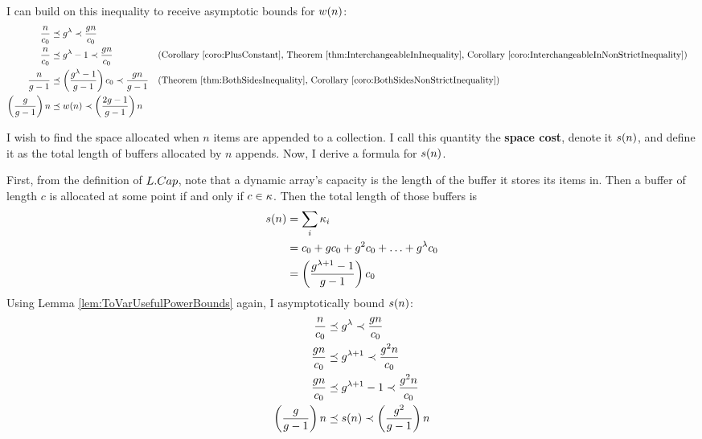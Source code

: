 I can build on this inequality to receive asymptotic bounds for $w(n)$:
\begin{align*}
\frac n \VarInitCapacity &\FluteLeq \VarGrowthFactor^\VarUseful \FluteLess \frac {\VarGrowthFactor{n}} \VarInitCapacity\\
\frac n \VarInitCapacity &\FluteLeq \VarGrowthFactor^\VarUseful - 1 \FluteLess \frac {\VarGrowthFactor{n}} \VarInitCapacity &&\text{(Corollary \ref{coro:PlusConstant}, Theorem \ref{thm:InterchangeableInInequality}, Corollary \ref{coro:InterchangeableInNonStrictInequality})}\\
\frac n {\VarGrowthFactor - 1} &\FluteLeq \left( \frac{\VarGrowthFactor^\VarUseful - 1}{\VarGrowthFactor - 1} \right) \VarInitCapacity \FluteLess \frac {\VarGrowthFactor{n}} {\VarGrowthFactor - 1} &&\text{(Theorem \ref{thm:BothSidesInequality}, Corollary \ref{coro:BothSidesNonStrictInequality})}\\
\left( \frac{\VarGrowthFactor}{\VarGrowthFactor - 1} \right) n &\FluteLeq \FuncWrites(n) \FluteLess \left( \frac{2\VarGrowthFactor - 1}{\VarGrowthFactor - 1} \right) n %
\end{align*}
\HdrSpaceComplex

I wish to find the space allocated when $n$ items are appended to a collection. I call this quantity the \textbf{space cost}, denote it $s(n)$, and define it as the total length of buffers allocated by $n$ appends. Now, I derive a formula for $s(n)$.

First, from the definition of $L.Cap$, note that a dynamic array's capacity is the length of the buffer it stores its items in. Then a buffer of length $c$ is allocated at some point if and only if $c \in \kappa$. Then the total length of those buffers is
\begin{align*}
s(n) &= \sum_i {\kappa_i}\\
&= c_0 + gc_0 + g^2c_0 + \ldots + g^\lambda c_0\\
&= \left( \frac{g^{\lambda + 1} - 1}{g - 1} \right) c_0
\end{align*}
Using Lemma \ref{lem:ToVarUsefulPowerBounds} again, I asymptotically bound $s(n)$:
\begin{align*}
\frac n {c_0} &\preceq g^\lambda \prec \frac {g{n}} {c_0}\\
\frac {g n} {c_0} &\preceq g^{\lambda + 1} \prec \frac {g^2 n} {c_0}\\
\frac {g n} {c_0} &\preceq g^{\lambda + 1} - 1 \prec \frac {g^2 n} {c_0}\\
\left( \frac{g}{g - 1} \right) n &\preceq s(n) \prec \left( \frac{g^2}{g - 1} \right) n
\end{align*}